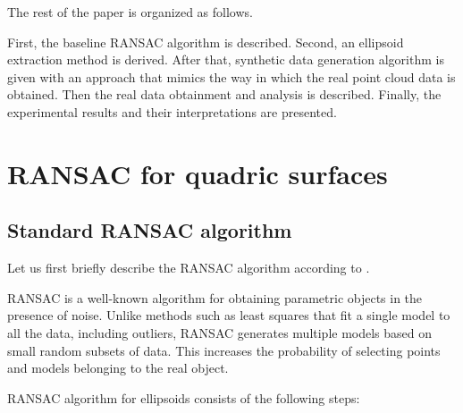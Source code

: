 The rest of the paper is organized as follows.

First, the baseline RANSAC algorithm is described.
Second, an ellipsoid extraction method is derived.
After that, synthetic data generation algorithm is given with an approach that mimics the way in which the real point cloud data is obtained.
Then the real data obtainment and analysis is described.
Finally, the experimental results and their interpretations are presented.

\section{RANSAC for quadric surfaces}
\label{sec_ransac_for_quadric_surfaces}

\subsection{Standard RANSAC algorithm}
\label{subsec_ransac_algorithm}

Let us first briefly describe the RANSAC algorithm according to \cite{fischler1981random}.

RANSAC is a well-known algorithm for obtaining parametric objects in the presence of noise.
Unlike methods such as least squares that fit a single model to all the data, including outliers, RANSAC generates multiple models based on small random subsets of data.
This increases the probability of selecting points and models belonging to the real object.

RANSAC algorithm for ellipsoids consists of the following steps:

